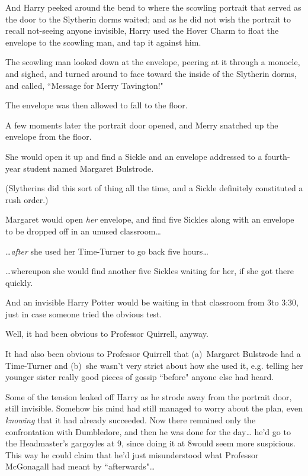 And Harry peeked around the bend to where the scowling portrait that served as the door to the Slytherin dorms waited; and as he did not wish the portrait to recall not-seeing anyone invisible, Harry used the Hover Charm to float the envelope to the scowling man, and tap it against him.

The scowling man looked down at the envelope, peering at it through a monocle, and sighed, and turned around to face toward the inside of the Slytherin dorms, and called, ``Message for Merry Tavington!"

The envelope was then allowed to fall to the floor.

A few moments later the portrait door opened, and Merry snatched up the envelope from the floor.

She would open it up and find a Sickle and an envelope addressed to a fourth-year student named Margaret Bulstrode.

(Slytherins did this sort of thing all the time, and a Sickle definitely constituted a rush order.)

Margaret would open \emph{her} envelope, and find five Sickles along with an envelope to be dropped off in an unused classroom{\ldots}

{\ldots}\emph{after} she used her Time-Turner to go back five hours{\ldots}

{\ldots}whereupon she would find another five Sickles waiting for her, if she got there quickly.

And an invisible Harry Potter would be waiting in that classroom from 3\pm to 3:30, just in case someone tried the obvious test.

Well, it had been obvious to Professor Quirrell, anyway.

It had also been obvious to Professor Quirrell that (a)~Margaret Bulstrode had a Time-Turner and (b)~she wasn't very strict about how she used it, e.g. telling her younger sister really good pieces of gossip ``before" anyone else had heard.

Some of the tension leaked off Harry as he strode away from the portrait door, still invisible. Somehow his mind had still managed to worry about the plan, even \emph{knowing} that it had already succeeded. Now there remained only the confrontation with Dumbledore, and then he was done for the day{\ldots} he'd go to the Headmaster's gargoyles at 9\pm, since doing it at 8\pm would seem more suspicious. This way he could claim that he'd just misunderstood what Professor McGonagall had meant by ``afterwards"{\ldots}

